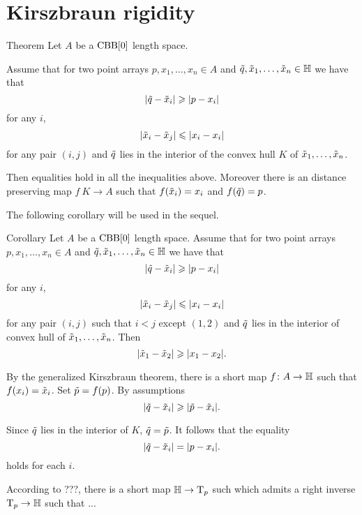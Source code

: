 \section{Kirszbraun rigidity}

\begin{thm}{Theorem}\label{thm:kirszbraun-rigid}
Let $A$ be a $\CBB[0]$ length space.

Assume that for two point arrays $p,x_1,\dots,x_n\in A$ and $\~q, \~x_1,\dots,\~x_n\in \HH$ we have that 
\[|\~q-\~x_i|\ge |p-x_i|\]
for any $i$,
\[|\~x_i-\~x_j|\le |x_i-x_i|\]
for any pair $(i,j)$
and $\~q$ lies in the interior of the convex hull $K$ of $\~x_1,\dots,\~x_n$.

Then equalities hold in all the inequalities above.
Moreover there is an distance preserving map $f\:K\to A$ such that $f(\~x_i)=x_i$ and $f(\~q)=p$. 
\end{thm}

The following corollary will be used in the sequel.

\begin{thm}{Corollary}
Let $A$ be a $\CBB[0]$ length space.
Assume that for two point arrays $p,x_1,\dots,x_n\in A$ and $\~q, \~x_1,\dots,\~x_n\in \HH$ we have that 
\[|\~q-\~x_i|\ge |p-x_i|\]
for any $i$,
\[|\~x_i-\~x_j|\le |x_i-x_i|\]
for any pair $(i,j)$ such that $i<j$ except $(1,2)$
and $\~q$ lies in the interior of convex hull of $\~x_1,\dots,\~x_n$.
Then 
\[|\~x_1-\~x_2|\ge |x_1-x_2|.\]
\end{thm}

By the generalized Kirszbraun theorem, there is a short map $f\:A\to \HH$
such that $f(x_i)=\~x_i$.
Set  $\~p=f(p)$.
By assumptions
\[|\~q-\~x_i|\ge |\~p-\~x_i|.\]

Since $\~q$ lies in the interior of $K$, $\~q=\~p$.
It follows that the equality 
\[|\~q-\~x_i|= |p-x_i|.\]
holds for each $i$.

According to ???, there is a short map $\HH\to \T_p$ such which admits a right inverse $\T_p\to \HH$ such that ...



\qeds